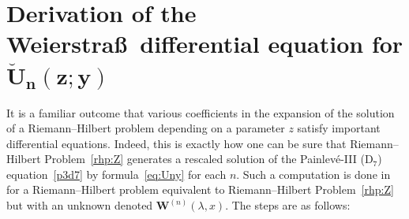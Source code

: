 \documentclass[11pt]{article}
\numberwithin{equation}{section}
\numberwithin{equation}{section}
\begin{document}
\section[Derivation of the Weierstrass differential equation for breve{U}\_\{n\}(z;y)]{Derivation of the Weierstra\ss\ differential equation for $\boldsymbol{\breve{U}_n(z;y)}$}
It is a familiar outcome that various coefficients in the expansion of the solution of a Riemann--Hilbert problem depending on a parameter $z$ satisfy important differential equations. Indeed, this is exactly how one can be sure that Riemann--Hilbert Problem~\ref{rhp:Z} generates a rescaled solution of the Painlev\'e-III (D$_7$) equation~\eqref{p3d7} by formula~\eqref{eq:Uny} for each $n$. Such a computation is done in~\cite[Section 3.2]{BuckinghamM22} for a Riemann--Hilbert problem equivalent to Riemann--Hilbert Problem~\ref{rhp:Z} but with an unknown denoted $\mathbf{W}^{(n)}(\lambda,x)$. The steps are as follows:
\end{document}
